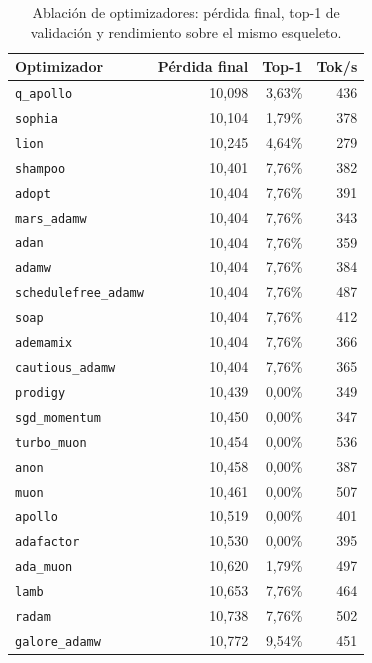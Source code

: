 \begin{table}[H]
\centering
\small
\caption{Ablación de optimizadores: pérdida final, top-1 de validación y rendimiento sobre el mismo esqueleto.}
\label{tab:r2-optimizers}
\begin{tabular}{lrrr}
\toprule
Optimizador & Pérdida final & Top-1 & Tok/s \\
\midrule
\texttt{q\_apollo}           & 10,098 & 3,63\% & 436 \\
\texttt{sophia}              & 10,104 & 1,79\% & 378 \\
\texttt{lion}                & 10,245 & 4,64\% & 279 \\
\texttt{shampoo}             & 10,401 & 7,76\% & 382 \\
\texttt{adopt}               & 10,404 & 7,76\% & 391 \\
\texttt{mars\_adamw}         & 10,404 & 7,76\% & 343 \\
\texttt{adan}                & 10,404 & 7,76\% & 359 \\
\texttt{adamw}               & 10,404 & 7,76\% & 384 \\
\texttt{schedulefree\_adamw} & 10,404 & 7,76\% & 487 \\
\texttt{soap}                & 10,404 & 7,76\% & 412 \\
\texttt{ademamix}            & 10,404 & 7,76\% & 366 \\
\texttt{cautious\_adamw}     & 10,404 & 7,76\% & 365 \\
\texttt{prodigy}             & 10,439 & 0,00\% & 349 \\
\texttt{sgd\_momentum}       & 10,450 & 0,00\% & 347 \\
\texttt{turbo\_muon}         & 10,454 & 0,00\% & 536 \\
\texttt{anon}                & 10,458 & 0,00\% & 387 \\
\texttt{muon}                & 10,461 & 0,00\% & 507 \\
\texttt{apollo}              & 10,519 & 0,00\% & 401 \\
\texttt{adafactor}           & 10,530 & 0,00\% & 395 \\
\texttt{ada\_muon}           & 10,620 & 1,79\% & 497 \\
\texttt{lamb}                & 10,653 & 7,76\% & 464 \\
\texttt{radam}               & 10,738 & 7,76\% & 502 \\
\texttt{galore\_adamw}       & 10,772 & 9,54\% & 451 \\
\bottomrule
\end{tabular}
\end{table}

